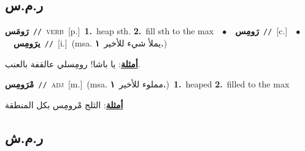 \documentclass[10pt,a4paper,twoside]{article} %
\begin{document}
\begin{multicols}{2}
\vspace{-3mm}
\subsection*{\color{blue}\foreignlanguage{arabic}{ر.م.س}\color{blue}{}} 

{\setlength\topsep{0pt}\textbf{\foreignlanguage{arabic}{رَومَس}}\ {\color{gray}\texttt{//}\color{black}}\ \textsc{verb}\ [p.]\ \textbf{1.}~heap sth.  \textbf{2.}~fill sth to the max\ \ $\bullet$\ \ \setlength\topsep{0pt}\textbf{\foreignlanguage{arabic}{رَومِس}}\ {\color{gray}\texttt{//}\color{black}}\ [c.]\ \ $\bullet$\ \ \setlength\topsep{0pt}\textbf{\foreignlanguage{arabic}{يرَومِس}}\ {\color{gray}\texttt{//}\color{black}}\ [i.]\ \color{gray}(msa. \foreignlanguage{arabic}{يملأ شيء للأخير}~\foreignlanguage{arabic}{\textbf{١.}})\color{black}\  \begin{flushright}\color{gray}\foreignlanguage{arabic}{\textbf{\underline{\foreignlanguage{arabic}{أمثلة}}}: يا باشا! رومِسلي عالقفة بالعنب.}\end{flushright}\color{black}} \vspace{2mm}

{\setlength\topsep{0pt}\textbf{\foreignlanguage{arabic}{مْرَومِس}}\ {\color{gray}\texttt{//}\color{black}}\ \textsc{adj}\ [m.]\ \color{gray}(msa. \foreignlanguage{arabic}{مملوء للأخير}~\foreignlanguage{arabic}{\textbf{١.}})\color{black}\ \textbf{1.}~heaped  \textbf{2.}~filled to the max\  \begin{flushright}\color{gray}\foreignlanguage{arabic}{\textbf{\underline{\foreignlanguage{arabic}{أمثلة}}}: الثلج مْرومِس بكل المنطقة}\end{flushright}\color{black}} \vspace{2mm}

\vspace{-3mm}
\subsection*{\color{blue}\foreignlanguage{arabic}{ر.م.ش}\color{blue}{}} 


\end{multicols}
\end{document}
